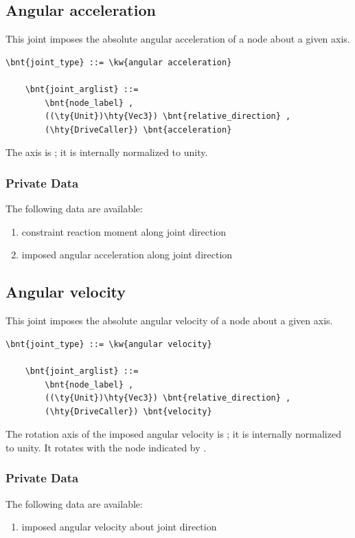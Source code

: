 \subsection{Angular acceleration}
This joint imposes the absolute angular acceleration of a node
about a given axis.
\begin{Verbatim}[commandchars=\\\{\}]
    \bnt{joint_type} ::= \kw{angular acceleration}

    \bnt{joint_arglist} ::=
        \bnt{node_label} ,
        ((\ty{Unit})\hty{Vec3}) \bnt{relative_direction} , 
        (\hty{DriveCaller}) \bnt{acceleration}
\end{Verbatim}
The axis is ; it is internally normalized to unity.

\subsubsection{Private Data}
The following data are available:
\begin{enumerate}
\item {} constraint reaction moment along joint direction
\item {} imposed angular acceleration along joint direction
\end{enumerate}



\subsection{Angular velocity}
This joint imposes the absolute angular velocity of a node
about a given axis.
\begin{Verbatim}[commandchars=\\\{\}]
    \bnt{joint_type} ::= \kw{angular velocity}

    \bnt{joint_arglist} ::=
        \bnt{node_label} ,
        ((\ty{Unit})\hty{Vec3}) \bnt{relative_direction} , 
        (\hty{DriveCaller}) \bnt{velocity}
\end{Verbatim}
The rotation axis of the imposed angular velocity is ;
it is internally normalized to unity.
It rotates with the node indicated by .

\subsubsection{Private Data}
The following data are available:
\begin{enumerate}
\item {} imposed angular velocity about joint direction
\end{enumerate}



